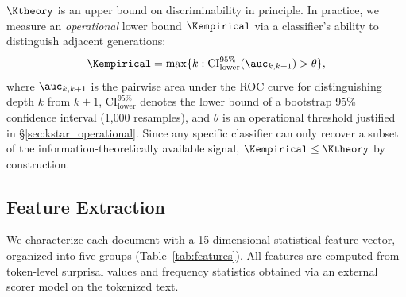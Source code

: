 $\Ktheory$ is an upper bound on discriminability in principle.
In practice, we measure an \emph{operational} lower bound $\Kempirical$ via a classifier's ability to distinguish adjacent generations:
\begin{equation}
  \Kempirical = \max\{k : \text{CI}_{\text{lower}}^{95\%}(\auc_{k,k+1}) > \theta\},
  \label{eq:kstar}
\end{equation}
where $\auc_{k,k+1}$ is the pairwise area under the ROC curve for distinguishing depth $k$ from $k{+}1$, $\text{CI}_{\text{lower}}^{95\%}$ denotes the lower bound of a bootstrap 95\% confidence interval (1{,}000 resamples), and $\theta$ is an operational threshold justified in \S\ref{sec:kstar_operational}.
Since any specific classifier can only recover a subset of the information-theoretically available signal, $\Kempirical \leq \Ktheory$ by construction.

\subsection{Feature Extraction}
\label{sec:features}

We characterize each document with a 15-dimensional statistical feature vector, organized into five groups (Table~\ref{tab:features}).
All features are computed from token-level surprisal values and frequency statistics obtained via an external scorer model on the tokenized text.

